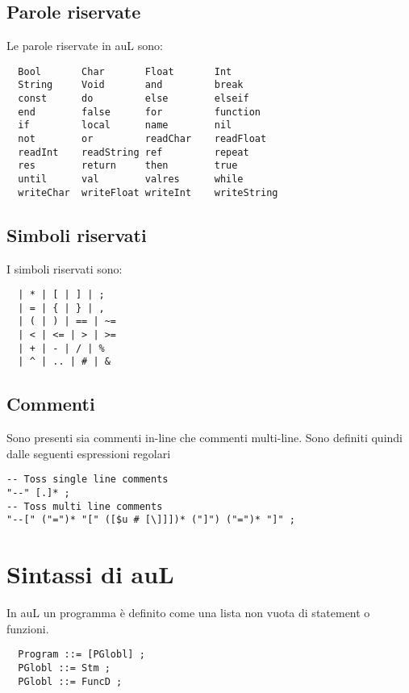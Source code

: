 \documentclass{article}
\begin{document}
\subsection*{Parole riservate}
Le parole riservate in auL sono:
\begin{verbatim}
  Bool       Char       Float       Int
  String     Void       and         break
  const      do         else        elseif
  end        false      for         function
  if         local      name        nil
  not        or         readChar    readFloat
  readInt    readString ref         repeat
  res        return     then        true
  until      val        valres      while
  writeChar  writeFloat writeInt    writeString
\end{verbatim}

\subsection*{Simboli riservati}
I simboli riservati sono:
\begin{verbatim}
  | * | [ | ] | ;
  | = | { | } | ,
  | ( | ) | == | ~=
  | < | <= | > | >=
  | + | - | / | %
  | ^ | .. | # | &
\end{verbatim}
\subsection*{Commenti}
Sono presenti sia commenti in-line che commenti multi-line. Sono definiti quindi dalle seguenti espressioni regolari
\begin{verbatim}
-- Toss single line comments
"--" [.]* ;
-- Toss multi line comments
"--[" ("=")* "[" ([$u # [\]]])* ("]") ("=")* "]" ;
\end{verbatim}

\section{Sintassi di auL}
In auL un programma è definito come una lista non vuota di statement o funzioni.
\begin{verbatim}
  Program ::= [PGlobl] ;
  PGlobl ::= Stm ;
  PGlobl ::= FuncD ;
\end{verbatim}
\end{document}
